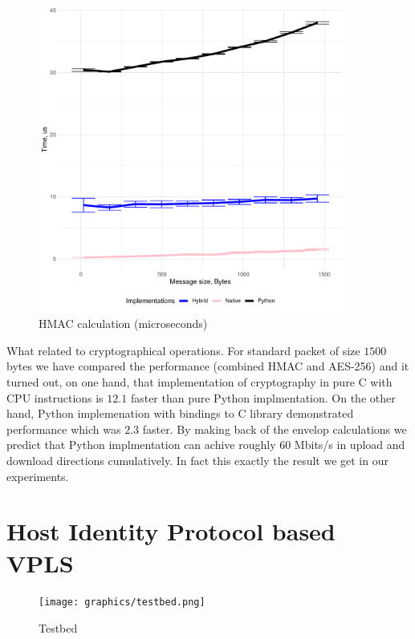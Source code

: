 \begin{figure}[h!]
    \centering
    \includegraphics[width=0.9\textwidth]{graphics/crypto/hmac.pdf}
    \caption{HMAC calculation (microseconds)}
    \label{fig:aes}
\end{figure}


What related to cryptographical operations. 
For standard packet of size $1500$ bytes we have compared the performance (combined HMAC and AES-256)
and it turned out, on one hand, that implementation of cryptography in pure C with CPU instructions is 
$12.1$ faster than pure Python implmentation. On the other hand, Python implemenation with bindings
to C library demonstrated performance which was $2.3$ faster. By making back of the envelop calculations
we predict that Python implmentation can achive roughly $60$ Mbits/s in upload and download directions
cumulatively. In fact this exactly the result we get in our experiments.


\section{Host Identity Protocol based VPLS}

\begin{figure}[h!]
    \centering
    \texttt{[image: graphics/testbed.png]}
    \caption{Testbed}
    \label{fig:testbed}
\end{figure}


